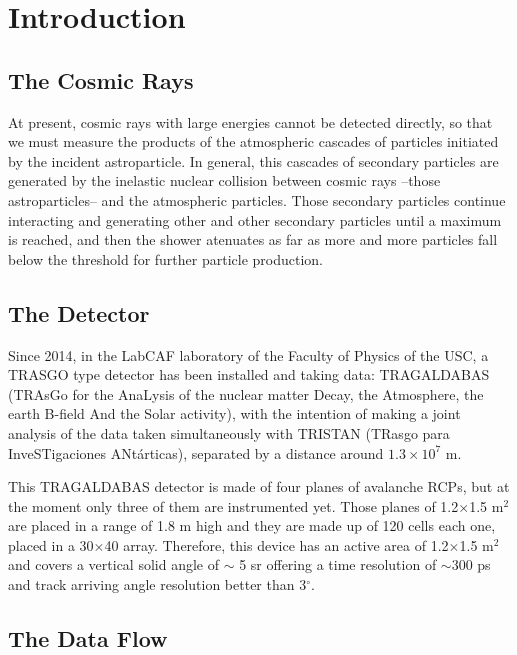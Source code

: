 \chapter{Introduction}


\section{The Cosmic Rays}

At present, cosmic rays with large energies cannot be detected directly, so that we must measure the products of the atmospheric cascades of particles initiated by the incident astroparticle. In general, this cascades of secondary particles are generated by the inelastic nuclear collision between cosmic rays --those astroparticles-- and the atmospheric particles. Those secondary particles continue interacting and generating other and other secondary particles until a maximum is reached, and then the shower atenuates as far as more and more particles fall below the threshold for further particle production.

\section{The Detector}

Since 2014, in the LabCAF laboratory of the Faculty of Physics of the USC, a TRASGO type detector has been installed and taking data: TRAGALDABAS (TRAsGo for the AnaLysis of the nuclear matter Decay, the Atmosphere, the earth B-field And the Solar activity), with the intention of making a joint analysis of the data taken simultaneously with TRISTAN (TRasgo para InveSTigaciones ANtárticas), separated by a distance around $1.3 \times 10^7$ m.

This TRAGALDABAS detector is made of four planes of avalanche RCPs, but at the moment only three of them are instrumented yet. Those planes of 1.2$\times$1.5 m$^2$ are placed in a range of 1.8 m high and they are made up of 120 cells each one, placed in a 30$\times$40 array. Therefore, this device has an active area of 1.2$\times$1.5 m$^2$ and covers a vertical solid angle of $\sim $ 5 sr offering a time resolution of $\sim 300$ ps and track arriving angle resolution better than 3$^\circ$. 

\section{The Data Flow}

